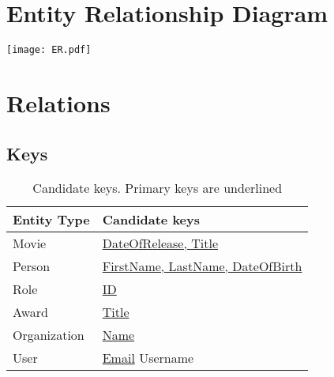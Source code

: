 \section{Entity Relationship Diagram}

\texttt{[image: ER.pdf]}

\section{Relations}

\subsection{Keys}
\begin{table}[h]
\centering
\begin{tabular}{|l|l|}
\hline
\textbf{Entity Type} & \textbf{Candidate keys} \\ \hline
Movie & \underline{DateOfRelease, Title} \\ \hline
Person & \underline{FirstName, LastName, DateOfBirth} \\ \hline
Role & \underline{ID} \\ \hline
Award & \underline{Title} \\ \hline
Organization & \underline{Name} \\ \hline
User & \underline{Email} \newline Username \\ \hline
\end{tabular}
\caption{Candidate keys. Primary keys are underlined}
\label{tbl:candidate_keys}
\end{table}